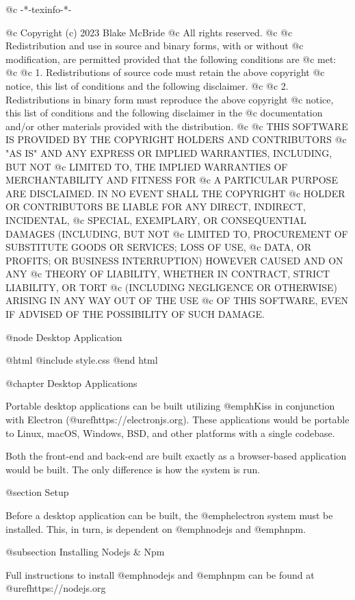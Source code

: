 @c -*-texinfo-*-

@c  Copyright (c) 2023 Blake McBride
@c  All rights reserved.
@c
@c  Redistribution and use in source and binary forms, with or without
@c  modification, are permitted provided that the following conditions are
@c  met:
@c
@c  1. Redistributions of source code must retain the above copyright
@c  notice, this list of conditions and the following disclaimer.
@c
@c  2. Redistributions in binary form must reproduce the above copyright
@c  notice, this list of conditions and the following disclaimer in the
@c  documentation and/or other materials provided with the distribution.
@c
@c  THIS SOFTWARE IS PROVIDED BY THE COPYRIGHT HOLDERS AND CONTRIBUTORS
@c  "AS IS" AND ANY EXPRESS OR IMPLIED WARRANTIES, INCLUDING, BUT NOT
@c  LIMITED TO, THE IMPLIED WARRANTIES OF MERCHANTABILITY AND FITNESS FOR
@c  A PARTICULAR PURPOSE ARE DISCLAIMED. IN NO EVENT SHALL THE COPYRIGHT
@c  HOLDER OR CONTRIBUTORS BE LIABLE FOR ANY DIRECT, INDIRECT, INCIDENTAL,
@c  SPECIAL, EXEMPLARY, OR CONSEQUENTIAL DAMAGES (INCLUDING, BUT NOT
@c  LIMITED TO, PROCUREMENT OF SUBSTITUTE GOODS OR SERVICES; LOSS OF USE,
@c  DATA, OR PROFITS; OR BUSINESS INTERRUPTION) HOWEVER CAUSED AND ON ANY
@c  THEORY OF LIABILITY, WHETHER IN CONTRACT, STRICT LIABILITY, OR TORT
@c  (INCLUDING NEGLIGENCE OR OTHERWISE) ARISING IN ANY WAY OUT OF THE USE
@c  OF THIS SOFTWARE, EVEN IF ADVISED OF THE POSSIBILITY OF SUCH DAMAGE.


@node Desktop Application

@html
@include style.css
@end html

@chapter Desktop Applications

Portable desktop
applications can be built utilizing @emph{Kiss} in conjunction with
Electron (@uref{https://electronjs.org}).  These
applications would be portable to Linux, macOS, Windows, BSD, and other
platforms with a single codebase.

Both the front-end and back-end are built exactly as a browser-based application would be built.
The only difference is how the system is run.

@section Setup

Before a desktop application can be built, the @emph{electron} system must be installed.
This, in turn, is dependent on @emph{nodejs} and @emph{npm}.

@subsection Installing Nodejs & Npm

Full instructions to install @emph{nodejs} and @emph{npm} can be found at
@uref{https://nodejs.org}

